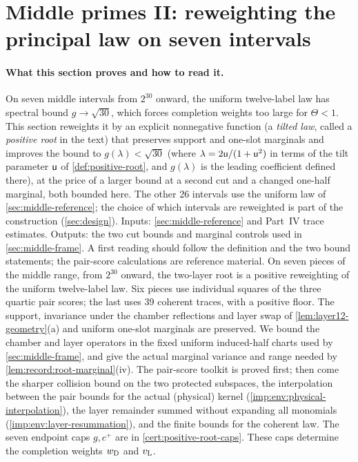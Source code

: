 
\section{Middle primes II: reweighting the principal law on seven intervals}
\label{sec:positive-roots}

\paragraph{What this section proves and how to read it.}
On seven middle intervals from $2^{30}$ onward, the uniform
twelve-label law has spectral bound $g\to\sqrt{30}$, which forces
completion weights too large for $\Theta<1$. This section
reweights it by an explicit nonnegative function (a \emph{tilted
law}, called a \emph{positive root} in the text) that preserves
support and one-slot marginals and improves the bound to
$g(\lambda)<\sqrt{30}$ (where $\lambda=2\mathsf u/(1+\mathsf u^2)$ in
terms of the tilt parameter $\mathsf u$ of
\cref{def:positive-root}, and $g(\lambda)$ is the leading
coefficient defined there), at the price of a larger bound at a
second
cut and a changed one-half marginal, both bounded here. The other
$26$ intervals use the uniform law of \cref{sec:middle-reference};
the choice of which intervals are reweighted is part of the
construction (\cref{sec:design}). Inputs: \cref{sec:middle-reference}
and Part~IV trace estimates. Outputs: the two cut bounds and
marginal controls used in \cref{sec:middle-frame}. A first reading
should follow the definition and the two bound statements; the
pair-score calculations are reference material.
On seven pieces of the middle range, from $2^{30}$ onward, the two-layer
root is a positive reweighting of the uniform twelve-label law. Six pieces
use individual squares of the three quartic pair scores; the last uses
39 coherent traces, with a positive floor. The support, invariance under the chamber
reflections and layer swap of \cref{lem:layer12-geometry}(a) and uniform
one-slot marginals are preserved. We bound the
chamber and layer operators in the fixed uniform induced-half charts
used by \cref{sec:middle-frame}, and give the actual marginal variance
and range needed by \cref{lem:record:root-marginal}(iv).
The pair-score toolkit is proved first; then come the sharper
collision bound on the two protected subspaces, the interpolation
between the pair bounds for the actual (physical) kernel
(\cref{imp:env:physical-interpolation}), the
layer remainder summed without expanding all monomials
(\cref{imp:env:layer-resummation}), and the
finite bounds for the coherent law. The seven endpoint caps
$g,c^+$ are in \cref{cert:positive-root-caps}. These caps
determine the completion
weights $w_{\rm D}$ and $v_{\rm L}$.

